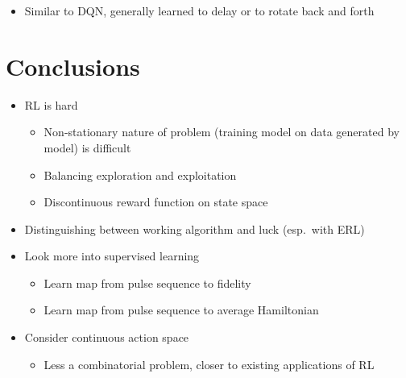 \documentclass[twocolumn, aps, prd]{revtex4-2}
\begin{document}

\begin{itemize}

\item
  Similar to DQN, generally learned to delay or to rotate back and forth
\end{itemize}

\section{Conclusions}


\begin{itemize}

\item
  RL is hard

  \begin{itemize}
  
  \item
    Non-stationary nature of problem (training model on data generated
    by model) is difficult
  \item
    Balancing exploration and exploitation
  \item
    Discontinuous reward function on state space
  \end{itemize}
\item
  Distinguishing between working algorithm and luck (esp.~with ERL)
\end{itemize}


\begin{itemize}

\item
  Look more into supervised learning

  \begin{itemize}
  
  \item
    Learn map from pulse sequence to fidelity
  \item
    Learn map from pulse sequence to average Hamiltonian
  \end{itemize}
\item
  Consider continuous action space

  \begin{itemize}
  
  \item
    Less a combinatorial problem, closer to existing applications of RL
  \end{itemize}
\end{itemize}


\end{document}
